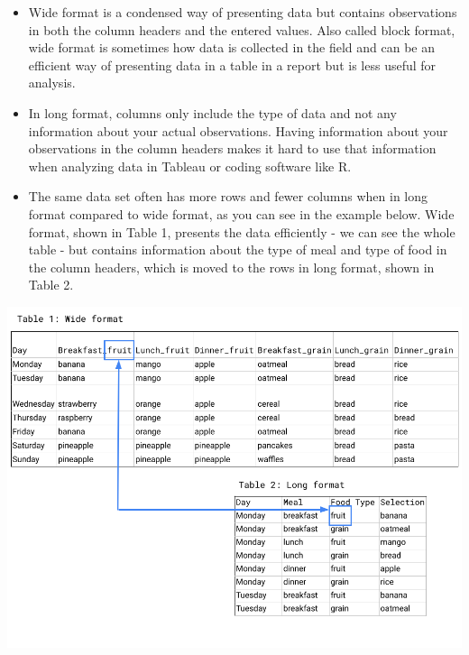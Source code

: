 \documentclass[
]{book}
\begin{document}
\begin{enumerate}
\begin{itemize}
    \begin{itemize}
    \item
      Wide format is a condensed way of presenting data but contains observations in both the column headers and the entered values. Also called block format, wide format is sometimes how data is collected in the field and can be an efficient way of presenting data in a table in a report but is less useful for analysis.
    \item
      In long format, columns only include the type of data and not any information about your actual observations. Having information about your observations in the column headers makes it hard to use that information when analyzing data in Tableau or coding software like R.
    \item
      The same data set often has more rows and fewer columns when in long format compared to wide format, as you can see in the example below. Wide format, shown in Table 1, presents the data efficiently - we can see the whole table - but contains information about the type of meal and type of food in the column headers, which is moved to the rows in long format, shown in Table 2.
    \end{itemize}
  \end{itemize}
\end{enumerate}

\includegraphics{images/M2S2_image2_long_vs_wide_format.png}
\end{document}
